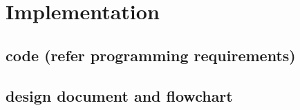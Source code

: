 \section{Implementation}


\subsection{code (refer programming requirements)}
\subsection{design document and flowchart}